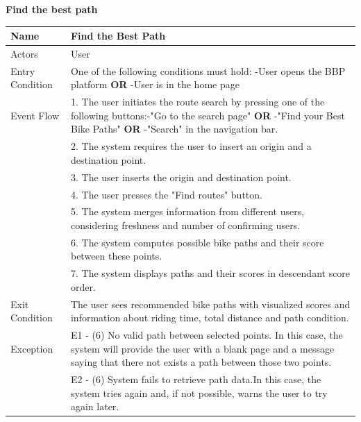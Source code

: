 \begin{enumerate}[label=\textbf{[UC\arabic*]}]
\begin{center}
\begin{tabular}{|p{4cm}|p{11cm}|}
                \hline
            \end{tabular}
        \end{center}
\newpage
    \item \textbf{Find the best path}
        \begin{center}
            \begin{tabular}{|p{4cm}|p{11cm}|}
                \hline
                \textbf{Name} & \textbf{Find the Best Path} \\
                \hline
                Actors & User \\
                \hline
                Entry Condition & One of the following conditions must hold: \newline -User opens the BBP platform \textbf{OR} \newline -User is in the home page\\
                \hline
                Event Flow & 1. The user initiates the route search by pressing one of the following buttons:\newline -"Go to the search page" \textbf{OR} \newline -"Find your Best Bike Paths" \textbf{OR} \newline -"Search" in the navigation bar. \\
                & 2. The system requires the user to insert an origin and a destination point. \\
                & 3. The user inserts the origin and destination point. \\
                & 4. The user presses the "Find routes" button.\\
                & 5. The system merges information from different users, considering freshness and number of confirming users.\\
                & 6. The system computes possible bike paths and their score between these points. \\
                & 7. The system displays paths and their scores in descendant score order. \\
                \hline
                Exit Condition & The user sees recommended bike paths with visualized scores and information about riding time, total distance and path condition. \\
                \hline
                Exception & E1 - (6) No valid path between selected points. \newline In this case, the system will provide the user with a blank page and a message saying that there not exists a path between those two points. \\
                & E2 - (6) System fails to retrieve path data.\newline In this case, the system tries again and, if not possible, warns the user to try again later. \\
                \hline
            \end{tabular}
        \end{center}
    

\end{enumerate}
